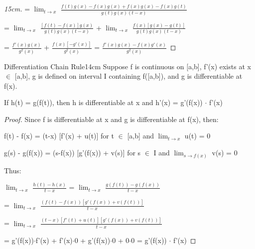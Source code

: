 \begin{enumerate}[label=(\alph*), leftmargin=2cm, itemsep=0.1cm]
\begin{proof}[15cm]
                \hspace{3.3cm}
                = $\lim_{t \rightarrow x}$ $\frac{f(t)g(x)-f(x)g(x)+f(x)g(x)-f(x)g(t)}
                                                    {g(t)g(x)(t-x)}$
                
                \hspace{3.3cm}
                = $\lim_{t \rightarrow x}$ $\frac{[f(t)-f(x)]g(x)}{g(t)g(x)(t-x)}$
                + $\lim_{t \rightarrow x}$ $\frac{f(x)[g(x)-g(t)]}{g(t)g(x)(t-x)}$
                
                \hspace{3.3cm}
                = $\frac{f'(x)g(x)}{g^2(x)}$ + $\frac{f(x)[-g'(x)]}{g^2(x)}$
                = $\frac{f'(x)g(x) - f(x)g'(x)}{g^2(x)}$
            \end{proof}
    \end{enumerate}

    \newpage



    \begin{wtheorem}{Differentiation Chain Rule}{14cm}
        Suppose f is continuous on [a,b], f'(x) exists at x $\in$ [a,b],
        g is defined on interval I containing f([a,b]), and
        g is differentiable at f(x).

        If h(t) = g(f(t)), then h is differentiable at x and
        h'(x) = g'(f(x)) $\cdot$ f'(x)
    \end{wtheorem}

    \begin{proof}
        Since f is differentiable at x and g is differentiable at f(x), then:

        \hspace{1cm}
        f(t) - f(x) = (t-x) [f'(x) + u(t)]
        \hspace{2cm}
        for t $\in$ [a,b] and $\lim_{t \rightarrow x}$ u(t) = 0

        \hspace{1cm}
        g(s) - g(f(x)) = (s-f(x)) [g'(f(x)) + v(s)]
        \hspace{0.5cm}
        for s $\in$ I and $\lim_{s \rightarrow f(x)}$ v(s) = 0

        Thus:

        \hspace{1cm}
        $\lim_{t \rightarrow x}$ $\frac{h(t) - h(x)}{t - x}$
        = $\lim_{t \rightarrow x}$ $\frac{g(f(t)) - g(f(x))}{t - x}$

        \hspace{3.8cm}
        = $\lim_{t \rightarrow x}$ $\frac{(f(t) - f(x))[g'(f(x)) + v(f(t))]}{t - x}$

        \hspace{3.8cm}
        = $\lim_{t \rightarrow x}$ $\frac{(t-x) [f'(t) + u(t)]
                                                [g'(f(x)) + v(f(t))]}{t - x}$
        
        \hspace{3.8cm}
        = g'(f(x))$\cdot$f'(x) + f'(x)$\cdot$0 + g'(f(x))$\cdot$0 + 0$\cdot$0
        = g'(f(x)) $\cdot$ f'(x)
    \end{proof}

